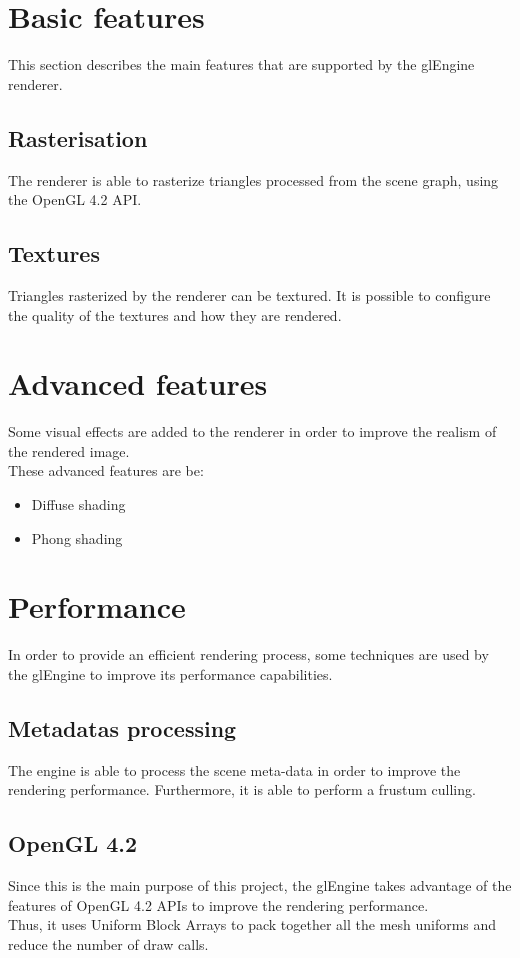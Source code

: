 \documentclass [a4 paper,11pt]{article}
\begin{document}
\section{Basic features}
This section describes the main features that are supported by the glEngine renderer.

\subsection{Rasterisation}
The renderer is able to rasterize triangles processed from the scene graph, using the OpenGL 4.2 API.
\subsection{Textures}
Triangles rasterized by the renderer can be textured. It is possible to configure the quality of the textures and how they are rendered.

\section{Advanced features}
Some visual effects are added to the renderer in order to improve the realism of the rendered image.\\
These advanced features are be:
\begin{itemize}
\item Diffuse shading
\item Phong shading
\end{itemize}

\section{Performance}
In order to provide an efficient rendering process, some techniques are used by the glEngine to improve its performance capabilities.

\subsection{Metadatas processing}
The engine is able to process the scene meta-data in order to improve the rendering performance. Furthermore, it is able to perform a frustum culling.

\subsection{OpenGL 4.2}
Since this is the main purpose of this project, the glEngine takes advantage of the features of OpenGL 4.2 APIs to improve the rendering performance.\\
Thus, it uses Uniform Block Arrays to pack together all the mesh uniforms and reduce the number of draw calls.
\end{document}

